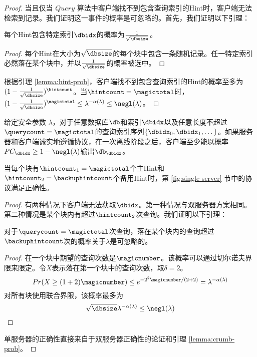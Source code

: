 \begin{proof}
    当且仅当 $Query$ 算法中客户端找不到包含查询索引的Hint时，客户端无法检索到记录。我们证明这一事件的概率是可忽略的。首先，我们证明以下引理：

    \begin{lemma}
    \label{lemma:hint-prob}
        每个Hint包含特定索引$\dbidx$的概率为$\frac{1}{\sqrt{\dbsize}}$。
    \end{lemma}

    \begin{proof}
    每个Hint在大小为$\sqrt{\dbsize}$的每个块中包含一条随机记录。任一特定索引必然落在某个块中，并以$\frac{1}{\sqrt{\dbsize}}$的概率被选中。
    \end{proof}

    根据引理 \ref{lemma:hint-prob}，客户端找不到包含查询索引的Hint的概率至多为$(1-\frac{1}{\sqrt{\dbsize}})^\hintcount$。当$\hintcount=\magictotal$时，$(1-\frac{1}{\sqrt{\dbsize}})^{\magictotal}\le \lambda^{-\alpha(\lambda)} \le \negl(\lambda)$。
\end{proof}

\begin{definition}[单服务器方案的正确性]
给定安全参数 $\lambda$，对于任意数据库$\db$和索引$\dbidx$以及任意长度不超过$\querycount=\magictotal$的查询索引序列$\{\dbidx_0,\dbidx_1, \dots\}$。如果服务器和客户端诚实地遵循协议，在一次离线阶段之后，客户端至少能以概率$PC_\dbidx \geq 1-\negl(\lambda)$输出$\db_\dbidx$。
\end{definition}

\begin{theorem}
    当每个块有$\hintcount_1=\magictotal$个主Hint和$\hintcount_2 = \backuphintcount$个备用Hint时，第 \ref{fig:single-server} 节中的协议满足正确性。
\end{theorem}

\begin{proof}
有两种情况下客户端无法获取$\dbidx$。第一种情况与双服务器方案相同。第二种情况是某个块内有超过$\hintcount_2$次查询。我们证明以下引理：

\begin{lemma}
\label{lemma:crumb-prob}
    对于$\querycount=\magictotal$次查询，落在某个块内的查询超过$\backuphintcount$次的概率关于$\lambda$是可忽略的。
\end{lemma}

\begin{proof}
    在一个块中期望的查询次数是$\magicnumber$。该概率可以通过切尔诺夫界限来限定。令$X$表示落在第一个块中的查询次数，取$\delta=2$。
$$ Pr(X \ge (1+2)\magicnumber) \le e^{-2^2\magicnumber/(2+2)} = \lambda^{-\alpha(\lambda)} $$ 
对所有块使用联合界限，该概率最多为
$$\sqrt{\dbsize}\lambda^{-\alpha(\lambda)} \le \negl(\lambda)$$
\end{proof}

单服务器的正确性直接来自于双服务器正确性的论证和引理 \ref{lemma:crumb-prob}。
\end{proof}

